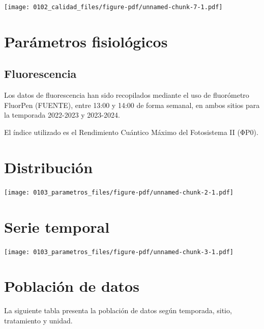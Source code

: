 \documentclass[
  letterpaper,
  DIV=11,
  numbers=noendperiod]{scrreprt}
\begin{document}
\begin{center}
\texttt{[image: 0102\_calidad\_files/figure-pdf/unnamed-chunk-7-1.pdf]}
\end{center}

\chapter{Parámetros fisiológicos}\label{paruxe1metros-fisioluxf3gicos}

\section{Fluorescencia}\label{fluorescencia}

Los datos de fluorescencia han sido recopilados mediante el uso de
fluorómetro FluorPen (FUENTE), entre 13:00 y 14:00 de forma semanal, en
ambos sitios para la temporada 2022-2023 y 2023-2024.

El índice utilizado es el Rendimiento Cuántico Máximo del Fotosistema II
(ΦP0).

\chapter{Distribución}

\begin{center}
\texttt{[image: 0103\_parametros\_files/figure-pdf/unnamed-chunk-2-1.pdf]}
\end{center}

\chapter{Serie temporal}

\begin{center}
\texttt{[image: 0103\_parametros\_files/figure-pdf/unnamed-chunk-3-1.pdf]}
\end{center}

\chapter{Población de datos}

La siguiente tabla presenta la población de datos según temporada,
sitio, tratamiento y unidad.
\end{document}
